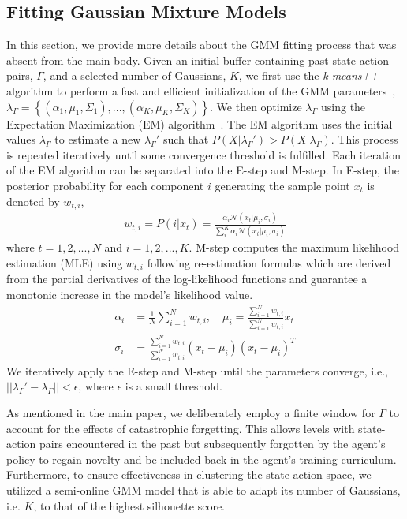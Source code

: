 \subsection{Fitting Gaussian Mixture Models}\label{section:fit_gaussian_mixtures}
In this section, we provide more details about the GMM fitting process that was absent from the main body. Given an initial buffer containing past state-action pairs, $\Gamma$, and a selected number of Gaussians, $K$, we first use the {\em k-means++} algorithm to perform a fast and efficient initialization of the GMM parameters~\cite{blomer2013simple, arthur2007k}, $\lambda_\Gamma=\left\{(\alpha_1, \mu_1, \Sigma_1), ..., (\alpha_K, \mu_K, \Sigma_K)\right\}$. We then optimize $\lambda_{\Gamma}$ using the Expectation Maximization (EM) algorithm~\cite{dempster1977maximum,redner1984mixture}. The EM algorithm uses the initial values $\lambda_{\Gamma}$ to estimate a new $\lambda_{\Gamma}'$ such that $P(X|\lambda_{\Gamma}') > P(X|\lambda_{\Gamma})$. This process is repeated iteratively until some convergence threshold is fulfilled. Each iteration of the EM algorithm can be separated into the E-step and M-step. In E-step, the posterior probability for each component $i$ generating the sample point $x_t$ is denoted by $w_{t,i}$,
\begin{align}
w_{t,i} = P(i|x_t) = \frac{\alpha_i \mathcal{N}(x_t|\mu_i,\sigma_i)}{\sum^{K}_{i}\alpha_i \mathcal{N}(x_t|\mu_i,\sigma_i)} \nonumber
\end{align}
where $t=1,2,...,N$ and $i=1,2,...,K$. M-step computes the maximum likelihood estimation (MLE) using $w_{t,i}$ following re-estimation formulas which are derived from the partial derivatives of the log-likelihood functions and guarantee a monotonic increase in the model’s likelihood value. 
\begin{align}
\alpha_i &= \frac{1}{N}\sum^{N}_{i=1} w_{t,i}, \quad 
\mu_i = \frac{\sum^{N}_{i=1} w_{t,i}}{\sum^{N}_{i=1} w_{t,i}} x_t \nonumber \\
\sigma_i &= \frac{\sum^{N}_{i=1} w_{t,i}}{\sum^{N}_{i=1} w_{t,i}}(x_t-\mu_i)(x_t-\mu_i)^T \nonumber 
\end{align}
We iteratively apply the E-step and M-step until the parameters converge, i.e., $||\lambda_{\Gamma}'-\lambda_{\Gamma}|| < \epsilon$, where $\epsilon$ is a small threshold.

As mentioned in the main paper, we deliberately employ a finite window for $\Gamma$ to account for the effects of catastrophic forgetting. This allows levels with state-action pairs encountered in the past but subsequently forgotten by the agent's policy to regain novelty and be included back in the agent’s training curriculum. Furthermore, to ensure effectiveness in clustering the state-action space, we utilized a semi-online GMM model that is able to adapt its number of Gaussians, i.e. $K$, to that of the highest silhouette score. 

